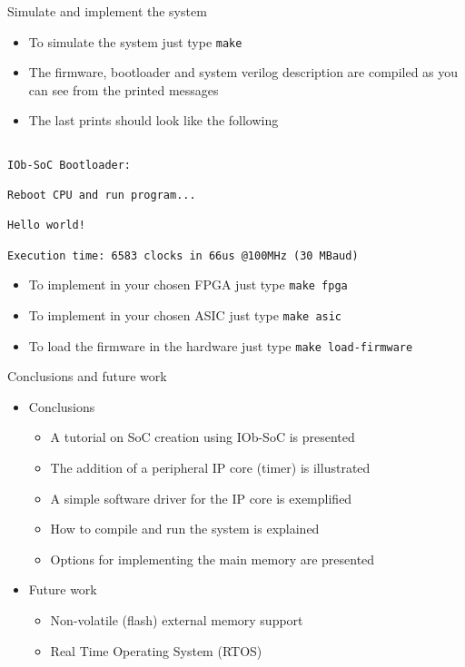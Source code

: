 \documentclass [xcolor=svgnames, t] {beamer}
\begin{document}
\begin{frame}[fragile]{Simulate and implement the system}

\begin{itemize}
\item To simulate the system just type {\tt make} 
\item The firmware, bootloader and system verilog description are compiled as you can see from the printed messages
\item The last prints should look like the following
\end{itemize}

\begin{tiny}
\begin{lstlisting}

IOb-SoC Bootloader:

Reboot CPU and run program...

Hello world!

Execution time: 6583 clocks in 66us @100MHz (30 MBaud)

\end{lstlisting}
\end{tiny}

\begin{itemize}
\item To implement in your chosen FPGA just type {\tt make fpga}
\item To implement in your chosen ASIC just type {\tt make asic}
\item To load the firmware in the hardware just type {\tt make load-firmware}
\end{itemize}

\end{frame}

\begin{frame}{Conclusions and future work}

\begin{itemize}
  \item Conclusions
    \begin{itemize}
    \item A tutorial on SoC creation using IOb-SoC is presented
    \item The addition of a peripheral IP core (timer) is illustrated
    \item A simple software driver for the IP core is exemplified
    \item How to compile and run the system is explained 
    \item Options for implementing the main memory are presented
    \end{itemize}
  \item Future work
    \begin{itemize}
    \item Non-volatile (flash) external memory support
    \item Real Time Operating System (RTOS) 
    \end{itemize}
\end{itemize}

\end{frame}
\end{document}
